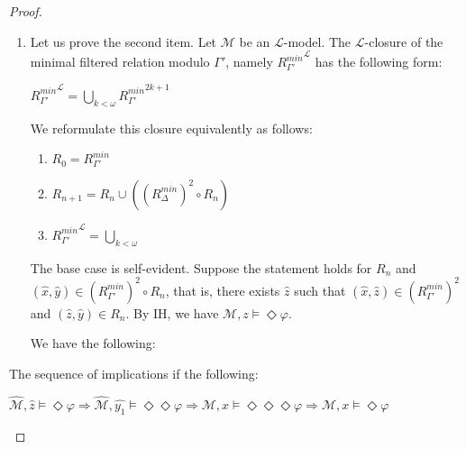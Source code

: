 \documentclass[a4paper]{article}
\theoremstyle{defin}
\theoremstyle{theorem}
\theoremstyle{prop}
\theoremstyle{lemma}
\theoremstyle{fact}
\theoremstyle{exercise}
\theoremstyle{ex}
\theoremstyle{col}
\theoremstyle{claim}
\begin{document}
\begin{proof}
\begin{enumerate}
  \item Let us prove the second item. Let $\mathcal{M}$ be an $\mathcal{L}$-model.
  The $\mathcal{L}$-closure of the minimal filtered relation modulo $\Gamma'$, namely ${R_{\Gamma'}^{min}}^{\mathcal{L}}$ has the following form:
  \begin{center}
    ${R_{\Gamma'}^{min}}^{\mathcal{L}} = \bigcup \limits_{k < \omega} {R_{\Gamma'}^{min}}^{2k + 1}$
  \end{center}
  We reformulate this closure equivalently as follows:
  \begin{enumerate}
    \item $R_0 = R_{\Gamma'}^{min}$
    \item $R_{n + 1} = R_n \cup ((R_{\Delta}^{min})^2 \circ R_n)$
    \item ${R_{\Gamma'}^{min}}^{\mathcal{L}} = \bigcup \limits_{k < \omega}$
  \end{enumerate}

  The base case is self-evident. Suppose the statement holds for $R_{n}$ and $(\hat{x}, \hat{y}) \in (R_{\Gamma'}^{min})^2 \circ R_n$, that is, there exists $\hat{z}$ such that $(\hat{x}, \hat{z}) \in (R_{\Gamma'}^{min})^2$ and $(\hat{z}, \hat{y}) \in R_n$. By IH, we have $\mathcal{M}, z \models \Diamond \varphi$.

  We have the following:

\end{enumerate}
  The sequence of implications if the following:
  \begin{center}
    $\widehat{\mathcal{M}}, \hat{z} \models \Diamond \varphi \Rightarrow \widehat{\mathcal{M}}, \widehat{y_1} \models \Diamond \Diamond \varphi \Rightarrow \mathcal{M}, x \models \Diamond \Diamond \Diamond \varphi \Rightarrow \mathcal{M}, x \models \Diamond \varphi$
  \end{center}
\end{proof}
\end{document}
